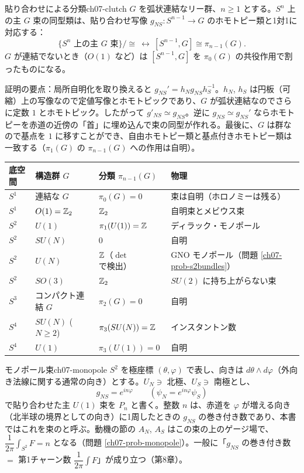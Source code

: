 \begin{mythm}{貼り合わせによる分類}{ch07-clutch}
$G$ を弧状連結なリー群、$n\ge1$ とする。$S^n$ 上の主 $G$ 束の同型類は、貼り合わせ写像 $g_{NS}\colon S^{n-1}\to G$ のホモトピー類と1対1に対応する：
\[
\{S^n\text{ 上の主 }G\text{ 束}\}/{\cong}\ \longleftrightarrow\ [S^{n-1},G]\cong\pi_{n-1}(G).
\]
$G$ が連結でないとき（$O(1)$ など）は $[S^{n-1},G]$ を $\pi_0(G)$ の共役作用で割ったものになる。
\end{mythm}
\begin{note}
証明の要点：局所自明化を取り換えると $g_{NS}'=h_Ng_{NS}h_S^{-1}$。$h_N$, $h_S$ は円板（可縮）上の写像なので定値写像とホモトピックであり、$G$ が弧状連結なのでさらに定数 $1$ とホモトピック。したがって $g'_{NS}\simeq g_{NS}$。逆に $g_{NS}\simeq g_{NS}'$ ならホモトピーを赤道の近傍の「首」に埋め込んで束の同型が作れる。最後に、$G$ は群なので基点を $1$ に移すことができ、自由ホモトピー類と基点付きホモトピー類は一致する（$\pi_1(G)$ の $\pi_{n-1}(G)$ への作用は自明）。
\end{note}

\begin{center}
\renewcommand{\arraystretch}{1.25}\small
\begin{tabular}{llll}
底空間 & 構造群 $G$ & 分類 $\pi_{n-1}(G)$ & 物理\\ \hline
$S^1$ & 連結な $G$ & $\pi_0(G)=0$ & 束は自明（ホロノミーは残る）\\
$S^1$ & $O(1)=\mathbb{Z}_2$ & $\mathbb{Z}_2$ & 自明束とメビウス束\\
$S^2$ & $U(1)$ & $\pi_1(U(1))=\mathbb{Z}$ & ディラック・モノポール\\
$S^2$ & $SU(N)$ & $0$ & 自明\\
$S^2$ & $U(N)$ & $\mathbb{Z}$（$\det$ で検出） & GNO モノポール（問題 \ref{ch07-prob-s2bundles}）\\
$S^2$ & $SO(3)$ & $\mathbb{Z}_2$ & $SU(2)$ に持ち上がらない束\\
$S^3$ & コンパクト連結 $G$ & $\pi_2(G)=0$ & 自明\\
$S^4$ & $SU(N)$ ($N\ge2$) & $\pi_3(SU(N))=\mathbb{Z}$ & インスタントン数\\
$S^4$ & $U(1)$ & $\pi_3(U(1))=0$ & 自明
\end{tabular}
\end{center}

\begin{myex}{モノポール束}{ch07-monopole}
$S^2$ を極座標 $(\theta,\varphi)$ で表し、向きは $d\theta\wedge d\varphi$（外向き法線に関する通常の向き）とする。$U_N\ni$ 北極、$U_S\ni$ 南極とし、
\[
g_{NS}=e^{in\varphi}\qquad(\psi_N=e^{in\varphi}\psi_S)
\]
で貼り合わせた主 $U(1)$ 束を $P_n$ と書く。整数 $n$ は、赤道を $\varphi$ が増える向き（北半球の境界としての向き）に1周したときの $g_{NS}$ の巻き付き数であり、本書ではこれを束のと呼ぶ。動機の節の $A_N$, $A_S$ はこの束の上のゲージ場で、$\dfrac1{2\pi}\int_{S^2}F=n$ となる（問題 \ref{ch07-prob-monopole}）。一般に「$g_{NS}$ の巻き付き数 $=$ 第1チャーン数 $\dfrac1{2\pi}\int F$」が成り立つ（第8章）。
\end{myex}


